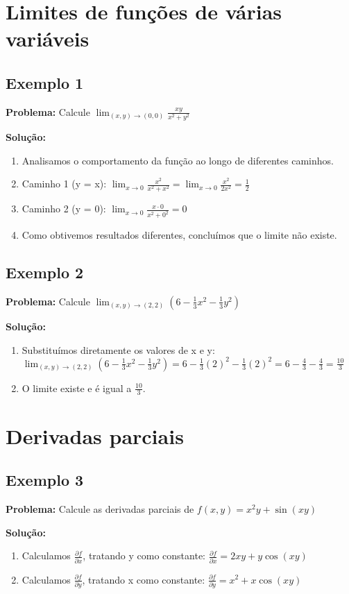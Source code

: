 \section{Limites de funções de várias variáveis}

\subsection{Exemplo 1}
\textbf{Problema:} Calcule $\lim_{(x,y) \to (0,0)} \frac{xy}{x^2 + y^2}$

\textbf{Solução:}
\begin{enumerate}
\item Analisamos o comportamento da função ao longo de diferentes caminhos.
\item Caminho 1 (y = x):
$\lim_{x \to 0} \frac{x^2}{x^2 + x^2} = \lim_{x \to 0} \frac{x^2}{2x^2} = \frac{1}{2}$
\item Caminho 2 (y = 0):
$\lim_{x \to 0} \frac{x \cdot 0}{x^2 + 0^2} = 0$
\item Como obtivemos resultados diferentes, concluímos que o limite não existe.
\end{enumerate}

\subsection{Exemplo 2}
\textbf{Problema:} Calcule $\lim_{(x,y) \to (2,2)} (6 - \frac{1}{3}x^2 - \frac{1}{3}y^2)$

\textbf{Solução:}
\begin{enumerate}
\item Substituímos diretamente os valores de x e y:
$\lim_{(x,y) \to (2,2)} (6 - \frac{1}{3}x^2 - \frac{1}{3}y^2) = 6 - \frac{1}{3}(2)^2 - \frac{1}{3}(2)^2 = 6 - \frac{4}{3} - \frac{4}{3} = \frac{10}{3}$
\item O limite existe e é igual a $\frac{10}{3}$.
\end{enumerate}

\section{Derivadas parciais}

\subsection{Exemplo 3}
\textbf{Problema:} Calcule as derivadas parciais de $f(x,y) = x^2y + \sin(xy)$

\textbf{Solução:}
\begin{enumerate}
\item Calculamos $\frac{\partial f}{\partial x}$, tratando y como constante:
$\frac{\partial f}{\partial x} = 2xy + y\cos(xy)$
\item Calculamos $\frac{\partial f}{\partial y}$, tratando x como constante:
$\frac{\partial f}{\partial y} = x^2 + x\cos(xy)$
\end{enumerate}

